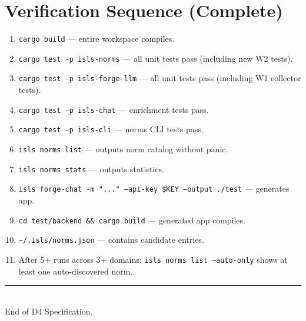 \documentclass[11pt,a4paper]{article}
\begin{document}
\section{Verification Sequence (Complete)}
\label{sec:verification}

\begin{enumerate}
\item \texttt{cargo build} --- entire workspace compiles.
\item \texttt{cargo test -p isls-norms} --- all unit tests pass 
      (including new W2 tests).
\item \texttt{cargo test -p isls-forge-llm} --- all unit tests pass 
      (including W1 collector tests).
\item \texttt{cargo test -p isls-chat} --- enrichment tests pass.
\item \texttt{cargo test -p isls-cli} --- norms CLI tests pass.
\item \texttt{isls norms list} --- outputs norm catalog without panic.
\item \texttt{isls norms stats} --- outputs statistics.
\item \texttt{isls forge-chat -m "..." --api-key \$KEY --output ./test} 
      --- generates app.
\item \texttt{cd test/backend \&\& cargo build} --- generated app compiles.
\item \texttt{\textasciitilde/.isls/norms.json} --- contains candidate entries.
\item After 5+ runs across 3+ domains: \texttt{isls norms list --auto-only} 
      shows at least one auto-discovered norm.
\end{enumerate}

\vfill
\begin{center}
\color{isls-gray}\rule{0.5\textwidth}{0.4pt}\\[0.5em]
{\small End of D4 Specification.}
\end{center}
\end{document}
